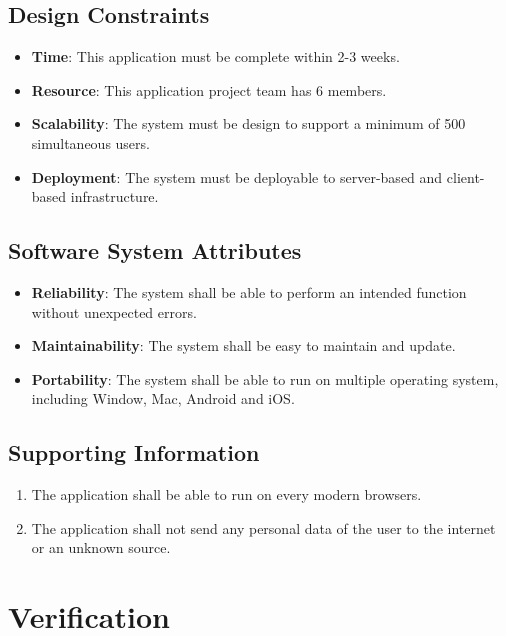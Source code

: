 \documentclass[ 10pt]{report}
\begin{document}
        \section{Design Constraints}
        \begin{itemize}
        \item \textbf{Time}: This application must be complete within 2-3 weeks.
        \item \textbf{Resource}: This application project team has 6 members.
        \item \textbf{Scalability}: The system must be design to support a minimum of 500 simultaneous users.
        \item \textbf{Deployment}: The system must be deployable to server-based and client-based infrastructure.
        \end{itemize}
        \section{Software System Attributes}
        \begin{itemize}
            \item \textbf{Reliability}: The system shall be able to perform an intended function without unexpected errors.
            \item \textbf{Maintainability}: The system shall be easy to maintain and update.
            \item \textbf{Portability}: The system shall be able to run on multiple operating system, including Window, Mac, Android and iOS.
        \end{itemize}
        \section{Supporting Information}
        \begin{enumerate}
            \item The application shall be able to run on every modern browsers.
            \item The application shall not send any personal data of the user to the internet or an unknown source.
        \end{enumerate}
    \pagebreak

    \chapter{Verification}
\end{document}

